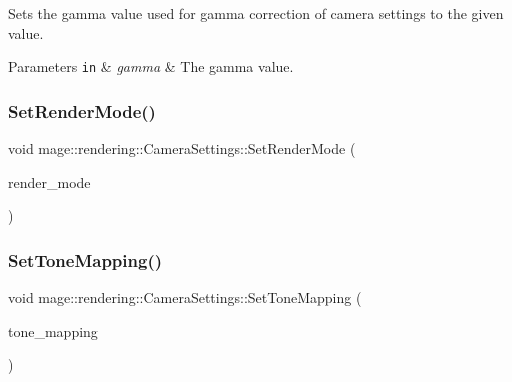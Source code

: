 Sets the gamma value used for gamma correction of camera settings to the given value.


\begin{DoxyParams}[1]{Parameters}
\mbox{\tt in}  & {\em gamma} & The gamma value. \\
\hline
\end{DoxyParams}
\mbox{\label{classmage_1_1rendering_1_1_camera_settings_aa4f29b081141c0acfb0e4d92eac81602}} 
\subsubsection{\texorpdfstring{Set\+Render\+Mode()}{SetRenderMode()}}
{\footnotesize\ttfamily void mage\+::rendering\+::\+Camera\+Settings\+::\+Set\+Render\+Mode (\begin{DoxyParamCaption}\item[{\mbox{\hyperlink{namespacemage_1_1rendering_aeb14ce7610cc9391f4e01be027b91dcc}{Render\+Mode}}}]{render\+\_\+mode }\end{DoxyParamCaption})\hspace{0.3cm}{\ttfamily [noexcept]}}

\mbox{\label{classmage_1_1rendering_1_1_camera_settings_ab5dc52d8f8d92cf3c4f6aca126f6dc47}} 
\subsubsection{\texorpdfstring{Set\+Tone\+Mapping()}{SetToneMapping()}}
{\footnotesize\ttfamily void mage\+::rendering\+::\+Camera\+Settings\+::\+Set\+Tone\+Mapping (\begin{DoxyParamCaption}\item[{\mbox{\hyperlink{namespacemage_1_1rendering_a789e4b7d9a8cc831b065e9c6bb7430e9}{Tone\+Mapping}}}]{tone\+\_\+mapping }\end{DoxyParamCaption})\hspace{0.3cm}{\ttfamily [noexcept]}}

